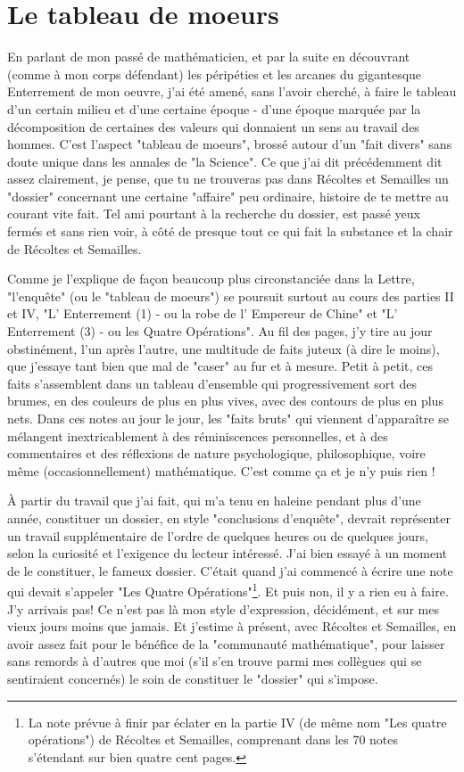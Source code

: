 \section{Le tableau de moeurs}

En parlant de mon passé de mathématicien, et par la suite en découvrant (comme à mon corps défendant) les péripéties et les arcanes du gigantesque Enterrement de mon oeuvre, j'ai été amené, sans l'avoir cherché, à faire le tableau d'un certain milieu et d'une certaine époque - d'une époque marquée par la décomposition de certaines des valeurs qui donnaient un sens au travail des hommes. C'est l'aspect "tableau de moeurs", brossé autour d'un "fait divers" sans doute unique dans les annales de "la Science". Ce que j'ai dit précédemment dit assez clairement, je pense, que tu ne trouveras pas dans Récoltes et Semailles un "dossier" concernant une certaine "affaire" peu ordinaire, histoire de te mettre au courant vite fait. Tel ami pourtant à la recherche du dossier, est passé yeux fermés et sans rien voir, à côté de presque tout ce qui fait la substance et la chair de Récoltes et Semailles.

Comme je l'explique de façon beaucoup plus circonstanciée dans la Lettre, "l'enquête" (ou le "tableau de moeurs") se poursuit surtout au cours des parties II et IV, "L' Enterrement (1) - ou la robe de l' Empereur de Chine" et "L' Enterrement (3) - ou les Quatre Opérations". Au fil des pages, j'y tire au jour obstinément, l'un après l'autre, une multitude de faits juteux (à dire le moins), que j'essaye tant bien que mal de "caser" au fur et à mesure. Petit à petit, ces faits s'assemblent dans un tableau d'ensemble qui progressivement sort des brumes, en des couleurs de plus en plus vives, avec des contours de plus en plus nets. Dans ces notes au jour le jour, les "faits bruts" qui viennent d'apparaître se mélangent inextricablement à des réminiscences personnelles, et à des commentaires et des réflexions de nature psychologique, philosophique, voire même (occasionnellement) mathématique. C'est comme ça et je n'y puis rien !

À partir du travail que j'ai fait, qui m'a tenu en haleine pendant plus d'une année, constituer un dossier, en style "conclusions d'enquête", devrait représenter un travail supplémentaire de l'ordre de quelques heures ou de quelques jours, selon la curiosité et l'exigence du lecteur intéressé. J'ai bien essayé à un moment de le constituer, le fameux dossier. C'était quand j'ai commencé à écrire une note qui devait s'appeler "Les Quatre Opérations"\footnote{La note prévue à finir par éclater en la partie IV (de même nom "Les quatre opérations") de Récoltes et Semailles, comprenant dans les 70 notes s'étendant sur bien quatre cent pages.}. Et puis non, il y a rien eu à faire. J'y arrivais pas! Ce n'est pas là mon style d'expression, décidément, et sur mes vieux jours moins que jamais. Et j'estime à présent, avec Récoltes et Semailles, en avoir assez fait pour le bénéfice de la "communauté mathématique", pour laisser sans remords à d'autres que moi (s'il s'en trouve parmi mes collègues qui se sentiraient concernés) le soin de constituer le "dossier" qui s'impose.


